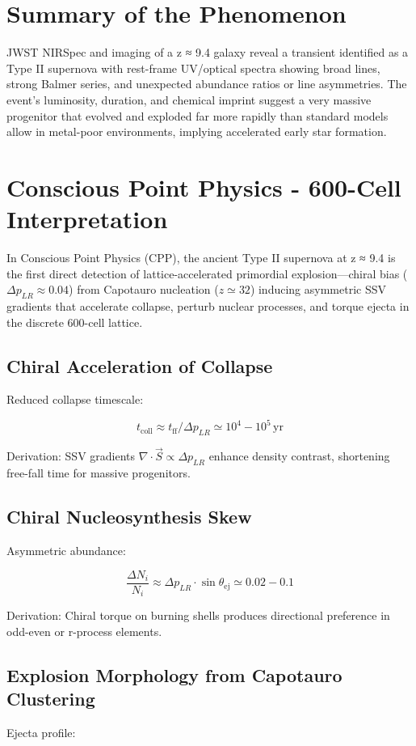 \documentclass[11pt]{article}
\begin{document}
\section{Summary of the Phenomenon}
JWST NIRSpec and imaging of a z ≈ 9.4 galaxy reveal a transient identified as a Type II supernova with rest-frame UV/optical spectra showing broad lines, strong Balmer series, and unexpected abundance ratios or line asymmetries. The event's luminosity, duration, and chemical imprint suggest a very massive progenitor that evolved and exploded far more rapidly than standard models allow in metal-poor environments, implying accelerated early star formation.

\section{Conscious Point Physics - 600-Cell Interpretation}
In Conscious Point Physics (CPP), the ancient Type II supernova at z ≈ 9.4 is the first direct detection of lattice-accelerated primordial explosion—chiral bias ($\Delta p_{LR} \approx 0.04$) from Capotauro nucleation ($z \simeq 32$) inducing asymmetric SSV gradients that accelerate collapse, perturb nuclear processes, and torque ejecta in the discrete 600-cell lattice.

\subsection{Chiral Acceleration of Collapse}
Reduced collapse timescale:

\[
t_{\text{coll}} \approx t_{\text{ff}} / \Delta p_{LR} \simeq 10^4 - 10^5 \, \text{yr}
\]

Derivation: SSV gradients $\nabla \cdot \vec{S} \propto \Delta p_{LR}$ enhance density contrast, shortening free-fall time for massive progenitors.

\subsection{Chiral Nucleosynthesis Skew}
Asymmetric abundance:

\[
\frac{\Delta N_i}{N_i} \approx \Delta p_{LR} \cdot \sin\theta_{\text{ej}} \simeq 0.02 - 0.1
\]

Derivation: Chiral torque on burning shells produces directional preference in odd-even or r-process elements.

\subsection{Explosion Morphology from Capotauro Clustering}
Ejecta profile:
\end{document}
